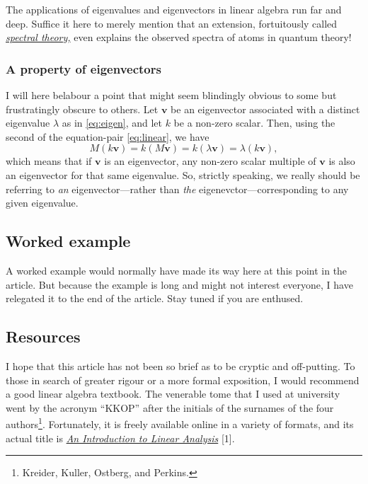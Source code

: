 \documentclass[
  11pt,
  british,
  a4paper,
]{article}
\begin{document}
The applications of eigenvalues and eigenvectors in linear algebra run
far and deep. Suffice it here to merely mention that an extension,
fortuitously called
\href{https://en.wikipedia.org/wiki/Spectral_theory}{\emph{spectral
theory,}} even explains the observed spectra of atoms in quantum theory!

\hypertarget{a-property-of-eigenvectors}{%
\subsubsection{A property of
eigenvectors}\label{a-property-of-eigenvectors}}

I will here belabour a point that might seem blindingly obvious to some
but frustratingly obscure to others. Let \(\symbf{v}\) be an eigenvector
associated with a distinct eigenvalue \(\lambda\) as in \cref{eq:eigen},
and let \(k\) be a non-zero scalar. Then, using the second of the
equation-pair \cref{eq:linear}, we have \begin{equation}
M(k\symbf{v}) = k(M\symbf{v}) = k(\lambda\symbf{v}) = \lambda(k\symbf{v}),
\label{eq:scaled-eigenvector}\end{equation} which means that if
\(\symbf{v}\) is an eigenvector, any non-zero scalar multiple of
\(\symbf{v}\) is also an eigenvector for that same eigenvalue. So,
strictly speaking, we really should be referring to \emph{an}
eigenvector---rather than \emph{the} eigenevctor---corresponding to any
given eigenvalue.

\hypertarget{worked-example}{%
\subsection{Worked example}\label{worked-example}}

A worked example would normally have made its way here at this point in
the article. But because the example is long and might not interest
everyone, I have relegated it to the end of the article. Stay tuned if
you are enthused.

\hypertarget{resources}{%
\subsection{Resources}\label{resources}}

I hope that this article has not been so brief as to be cryptic and
off-putting. To those in search of greater rigour or a more formal
exposition, I would recommend a good linear algebra textbook. The
venerable tome that I used at university went by the acronym ``KKOP''
after the initials of the surnames of the four authors\footnote{Kreider,
  Kuller, Ostberg, and Perkins.}. Fortunately, it is freely available
online in a variety of formats, and its actual title is
\href{https://archive.org/details/AnIntroductionToLinearAnalysis}{\emph{An
Introduction to Linear Analysis}} {[}1{]}.
\end{document}
